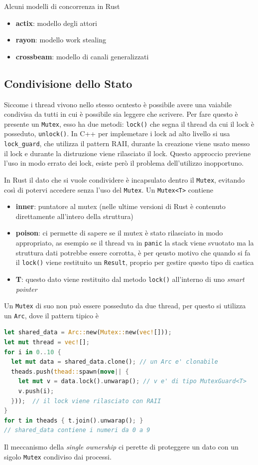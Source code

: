 \documentclass[12pt]{article}
\begin{document}
Alcuni modelli di concorrenza in Rust
\begin{itemize}
  \item \textbf{actix}: modello degli attori 
  \item \textbf{rayon}: modello work stealing
  \item \textbf{crossbeam}: modello di canali generalizzati
\end{itemize}

\subsection{Condivisione dello Stato}
Siccome i thread vivono nello stesso ocntesto \`e possibile avere una vaiabile condivisa da tutti in cui \`e possibile sia leggere che scrivere. Per fare questo \`e presente un \texttt{Mutex}, esso ha due metodi: \texttt{lock()} che segna il thread da cui il lock \`e posseduto, \texttt{unlock()}. In C++ per implemetare i lock ad alto livello si usa \texttt{lock\_guard}, che utilizza il pattern RAII, durante la creazione viene usato messo il lock e durante la distruzione viene rilasciato il lock. Questo approccio previene l'uso in modo errato dei lock, esiste per\`o il problema dell'utilizzo inopportuno.

In Rust il dato che si vuole condividere \`e incapsulato dentro il \texttt{Mutex}, evitando cos\`i di potervi accedere senza l'uso del \texttt{Mutex}. Un \texttt{Mutex<T>} contiene
\begin{itemize}
  \item \textbf{inner}: puntatore al mutex (nelle ultime versioni di Rust \`e contenuto direttamente all'intero della struttura)
  \item \textbf{poison}: ci permette di sapere se il mutex \`e stato rilasciato in modo appropriato, as esempio se il thread va in \texttt{panic} la stack viene svuotato ma la struttura dati potrebbe essere corrotta, \`e per qeusto motivo che quando si fa il \texttt{lock()} viene restituito un \texttt{Result}, proprio per gestire questo tipo di castica
  \item \textbf{T}: questo dato viene restituito dal metodo \texttt{lock()} all'interno di uno \emph{smart pointer}
\end{itemize}
Un \texttt{Mutex} di suo non pu\`o essere posseduto da due thread, per questo si utilizza un \texttt{Arc}, dove il pattern tipico \`e
\begin{lstlisting}[language=rust]
let shared_data = Arc::new(Mutex::new(vec![]));
let mut thread = vec![];
for i in 0..10 {
  let mut data = shared_data.clone(); // un Arc e' clonabile
  theads.push(thead::spawn(move|| {
    let mut v = data.lock().unwarap(); // v e' di tipo MutexGuard<T>
    v.push(i);
  }));  // il lock viene rilasciato con RAII
}
for t in theads { t.join().unwarap(); }
// shared_data contiene i numeri da 0 a 9
\end{lstlisting}
Il meccanismo della \emph{single ownership} ci perette di proteggere un dato con un sigolo \texttt{Mutex} condiviso dai processi.
\end{document}
